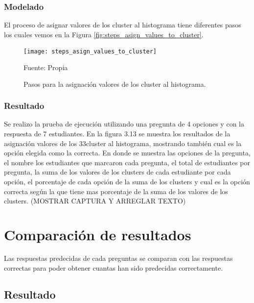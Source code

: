 \subsubsection{Modelado}

El proceso de asignar valores de los cluster al histograma tiene diferentes pasos los cuales vemos en la Figura \ref{fig:steps_asign_values_to_cluster}.

\begin{figure}[ht]
	\begin{center}
		\texttt{[image: steps\_asign\_values\_to\_cluster]}
	\end{center}
	\begin{center}
		\vskip -0.5cm
		\caption{\small{Pasos para la asignación valores de los cluster al histograma.}}
		{\small{Fuente: Propia}}
	\end{center}
\end{figure}

\subsubsection{Resultado}

Se realizo la prueba de ejecución utilizando una pregunta de 4 opciones y con la respuesta de 7 estudiantes. En la figura 3.13 se muestra los resultados de la asignación valores de los 33cluster al histograma, mostrando también cual es la opción elegida como la correcta. En donde se muestra las opciones de la pregunta, el nombre los estudiantes que marcaron cada pregunta,
el total de estudiantes por pregunta, la suma de los valores de los clusters de cada estudiante por cada opción, el porcentaje de cada opción de la suma de los clusters y cual es la opción correcta según la que tiene mas porcentaje de la suma de los valores de los clusters. (MOSTRAR CAPTURA Y ARREGLAR TEXTO)


\section{Comparación de resultados} 

Las respuestas predecidas de cada preguntas se comparan con las respuestas correctas para poder obtener cuantas han sido predecidas correctamente.

\subsection{Resultado}

